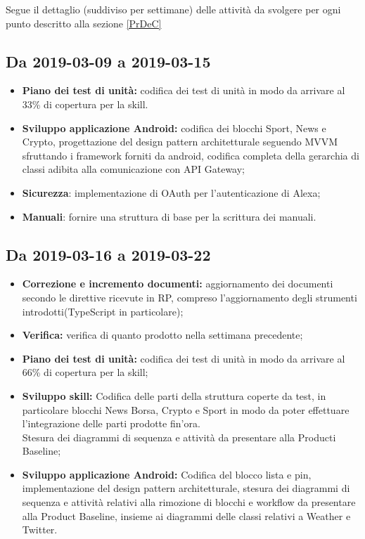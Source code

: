 \begin{flushleft}
Segue il dettaglio (suddiviso per settimane) delle attività da svolgere per ogni punto descritto alla sezione \ref{PrDeC}
\subsection{Da 2019-03-09 a 2019-03-15}\label{DCprimaSett}
\begin{itemize}
	
	\item \textbf{Piano dei test di unità:} codifica dei test di unità in modo da arrivare al 33\% di copertura per la skill.
	\item \textbf{Sviluppo applicazione Android:} codifica dei blocchi Sport, News e Crypto, progettazione del design pattern architetturale seguendo MVVM sfruttando i framework forniti da android, codifica completa della gerarchia di classi adibita alla comunicazione con API Gateway;
	\item \textbf{Sicurezza}: implementazione di OAuth per l'autenticazione di Alexa;
	\item \textbf{Manuali}: fornire una struttura di base per la scrittura dei manuali.
	
\end{itemize}


\subsection{Da 2019-03-16 a 2019-03-22}
\begin{itemize}
		
	\item \textbf{Correzione e incremento documenti:} aggiornamento dei documenti secondo le direttive ricevute in RP, compreso l'aggiornamento degli strumenti introdotti(TypeScript in particolare);
	\item \textbf{Verifica:} verifica di quanto prodotto nella settimana precedente;
	\item \textbf{Piano dei test di unità:} codifica dei test di unità in modo da arrivare al 66\% di copertura per la skill;
	\item \textbf{Sviluppo skill:} Codifica delle parti della struttura coperte da test, in particolare blocchi News Borsa, Crypto e Sport in modo da poter effettuare l'integrazione delle parti prodotte fin'ora.\\
	Stesura dei diagrammi di sequenza e attività da presentare alla Producti Baseline;
	\item \textbf{Sviluppo applicazione Android:} Codifica del blocco lista e pin, implementazione del design pattern architetturale, stesura dei diagrammi di sequenza e attività relativi alla rimozione di blocchi e workflow da presentare alla Product Baseline, insieme ai diagrammi delle classi relativi a Weather e Twitter.
\end{itemize}



\end{flushleft}
